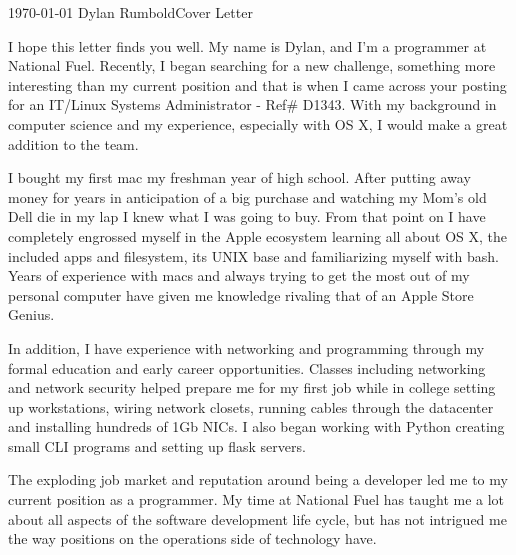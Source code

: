 \documentclass[11pt, letterpaper]{awesome-cv}
\begin{document}
\makecvheader[R]

\makecvfooter
  {\today}%
  {Dylan Rumbold{\enskip\cdotp\enskip}Cover Letter}
  {}

\makelettertitle
  {}

\begin{cvletter}

I hope this letter finds you well. My name is Dylan, and I'm a programmer at National Fuel. Recently, I began searching for a new challenge, something more interesting than my current position and that is when I came across your posting for an IT/Linux Systems Administrator - Ref\# D1343. With my background in computer science and my experience, especially with OS X, I would make a great addition to the team.

I bought my first mac my freshman year of high school. After putting away money for years in anticipation of a big purchase and watching my Mom's old Dell die in my lap I knew what I was going to buy. From that point on I have completely engrossed myself in the Apple ecosystem learning all about OS X, the included apps and filesystem, its UNIX base and familiarizing myself with bash. Years of experience with macs and always trying to get the most out of my personal computer have given me knowledge rivaling that of an Apple Store Genius. 

In addition, I have experience with networking and programming through my formal education and early career opportunities. Classes including networking and network security helped prepare me for my first job while in college setting up workstations,  wiring network closets, running cables through the datacenter and installing hundreds of 1Gb NICs. I also began working with Python creating small CLI programs and setting up flask servers. 

 The exploding job market and reputation around being a developer led me to my current position as a programmer. My time at National Fuel has taught me a lot about all aspects of the software development life cycle, but has not intrigued me the way positions on the operations side of technology have.


\end{cvletter}
\end{document}

